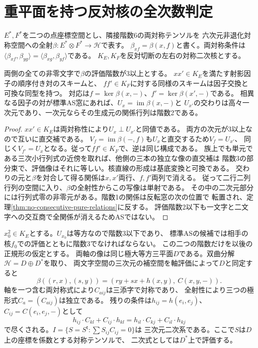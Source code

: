 \section{重平面を持つ反対核の全次数判定}
\label{sec:square-apolar-ore}
$E^*,F^*$を二つの点座標空間とし、隣接階数6の両対称テンソルを
六次元非退化対称空間への全射$\beta:E^*\otimes F^*\to\mathcal H$で表す。
$\beta_{xf}=\beta(x,f)$と書く。両対称条件は
$\langle\beta_{xf},\beta_{yg}\rangle=\langle\beta_{xg},\beta_{yf}\rangle$である。
$K_E,K_F$を反対切断の左右の対称二次核とする。

\begin{lemma}[因子の相互対応]\label{lem:reciprocal-apolar-factors}
両側の全ての非零文字で$\beta$の評価階数が3以上とする。
$xx'\in K_E$を満たす射影因子の順序付き対のスキームと、
$ff'\in K_F$に対する同様のスキームは因子交換と可換な同型を持つ。
対応は$f=\ker\beta(x,-)$、$f'=\ker\beta(x',-)$である。
相異なる因子の対が標準AS窓にあれば、$U_x=\operatorname{im}\beta(x,-)$と
$U_{x'}$の交わりは高々一次元であり、一次元ならその生成元の関係行列は階数2である。
\end{lemma}
\begin{proof}
$xx'\in K_E$は両対称性により$U_x\perp U_{x'}$と同値である。
両方の次元が3以上なので互いに直交補である。
$V_f=\operatorname{im}\beta(-,f)$も$U_x$と直交するため$V_f=U_{x'}$、
同じく$V_{f'}=U_x$となる。従って$ff'\in K_F$で、逆は同じ構成である。
族上でも単元である三次小行列式の近傍を取れば、他側の三本の独立な像の直交補は
階数3の部分束で、評価像はそれに等しい。核直線の形成は基底変換と可換である。
交わりの元と$\beta$を対合して得る関係は$x,x'$両行、$f,f'$両列で消える。
従って二行二列行列の空間に入り、$\beta$の全射性からこの写像は単射である。
その中の二次元部分には行列式零の非零元がある。階数1の関係は反転窓の次の位置で
転置され、定理\ref{thm:no-consecutive-pure-relations}に反する。
評価階数2以下も一文字と二文字への交互商で全関係が消えるためASではない。
\end{proof}

$x_0^2\in K_E$とする。$U_{x_0}$は等方なので階数3以下であり、
標準ASの候補では相手の核$f_0$での評価とともに階数3でなければならない。
この二つの階数だけを以後の正規形の仮定とする。
両軸の像は同じ極大等方三平面$D$である。双曲分解$\mathcal H=D\oplus D^*$を取り、
両文字空間の三次元の補空間を軸評価によって$D$と同定すると
\begin{equation}\label{eq:double-plane-beta}
 \beta((r,x),(s,y))=(r y+s x+h(x,y),\ C(x,y,-)).
\end{equation}
軸を一つ含む両対称式により$C_{aij}$は三添字で対称であり、
全射性により三つの極形式$C_a=(C_{aij})$は独立である。
残りの条件は$h_{ij}=h(e_i,e_j)$、$C_{ij}=C(e_i,e_j,-)$として
\begin{equation}\label{eq:double-plane-flat}
 h_{ij}\cdot C_{kl}+C_{ij}\cdot h_{kl}
 =h_{il}\cdot C_{kj}+C_{il}\cdot h_{kj}
\end{equation}
で尽くされる。$I=\{S=S^{\mathsf t}:\sum S_{ij}C_{ij}=0\}$は
三次元二次系である。ここで$S$は$D$上の座標を係数とする対称テンソルで、
二次式としては$D^*$上で評価する。

